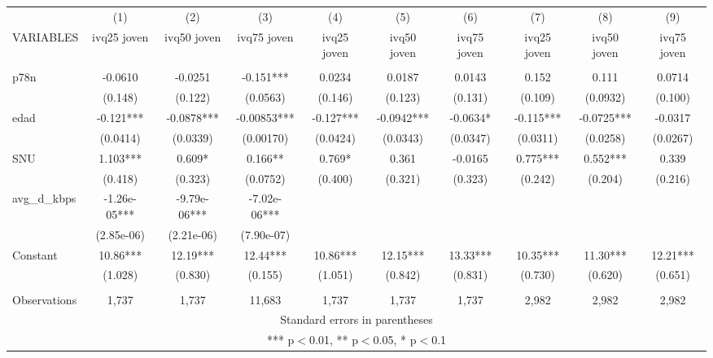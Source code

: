 \begin{tabular}{lccccccccc} \hline
 & (1) & (2) & (3) & (4) & (5) & (6) & (7) & (8) & (9) \\
VARIABLES & ivq25 joven & ivq50 joven & ivq75 joven & ivq25 joven & ivq50 joven & ivq75 joven & ivq25 joven & ivq50 joven & ivq75 joven \\ \hline
 &  &  &  &  &  &  &  &  &  \\
p78n & -0.0610 & -0.0251 & -0.151*** & 0.0234 & 0.0187 & 0.0143 & 0.152 & 0.111 & 0.0714 \\
 & (0.148) & (0.122) & (0.0563) & (0.146) & (0.123) & (0.131) & (0.109) & (0.0932) & (0.100) \\
edad & -0.121*** & -0.0878*** & -0.00853*** & -0.127*** & -0.0942*** & -0.0634* & -0.115*** & -0.0725*** & -0.0317 \\
 & (0.0414) & (0.0339) & (0.00170) & (0.0424) & (0.0343) & (0.0347) & (0.0311) & (0.0258) & (0.0267) \\
SNU & 1.103*** & 0.609* & 0.166** & 0.769* & 0.361 & -0.0165 & 0.775*** & 0.552*** & 0.339 \\
 & (0.418) & (0.323) & (0.0752) & (0.400) & (0.321) & (0.323) & (0.242) & (0.204) & (0.216) \\
avg\_d\_kbps & -1.26e-05*** & -9.79e-06*** & -7.02e-06*** &  &  &  &  &  &  \\
 & (2.85e-06) & (2.21e-06) & (7.90e-07) &  &  &  &  &  &  \\
Constant & 10.86*** & 12.19*** & 12.44*** & 10.86*** & 12.15*** & 13.33*** & 10.35*** & 11.30*** & 12.21*** \\
 & (1.028) & (0.830) & (0.155) & (1.051) & (0.842) & (0.831) & (0.730) & (0.620) & (0.651) \\
 &  &  &  &  &  &  &  &  &  \\
 Observations & 1,737 & 1,737 & 11,683 & 1,737 & 1,737 & 1,737 & 2,982 & 2,982 & 2,982 \\ \hline
\multicolumn{10}{c}{ Standard errors in parentheses} \\
\multicolumn{10}{c}{ *** p$<$0.01, ** p$<$0.05, * p$<$0.1} \\
\end{tabular}
